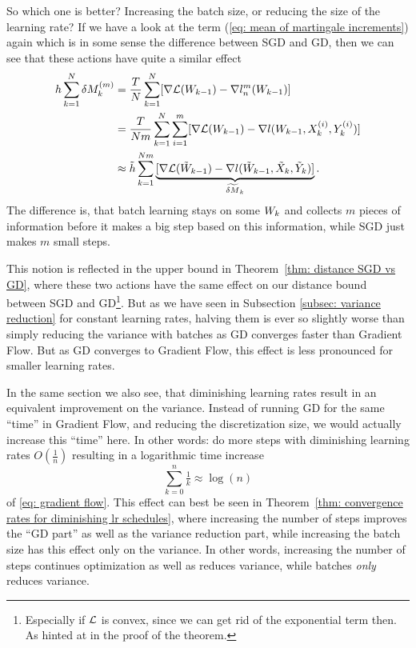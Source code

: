 So which one is better? Increasing the batch size, or reducing the size of the
learning rate? If we have a look at the term (\ref{eq: mean of
martingale increments}) again which is in some sense the difference between SGD
and GD, then we can see that these actions have quite a similar effect
\begin{align*}
	h\sum_{k=1}^N\delta M_k^{(m)}
	&=\frac{T}{N}\sum_{k=1}^N
	[\nabla\mathcal{L}(W_{k-1})- \nabla l_n^m(W_{k-1})]\\
	&=\frac{T}{Nm}\sum_{k=1}^N\sum_{i=1}^m
	[\nabla\mathcal{L}(W_{k-1})-\nabla l(W_{k-1},X^{(i)}_k, Y^{(i)}_k)]\\
	&\approx \tilde{h} \sum_{k=1}^{Nm}
	\underbrace{
		[\nabla\mathcal{L}(\tilde{W}_{k-1})
		-\nabla l(\tilde{W}_{k-1}, \tilde{X}_k, \tilde{Y}_k)]
	}_{\widetilde{\delta M}_k}.
\end{align*}
The difference is, that batch learning stays on some \(W_k\) and collects
\(m\) pieces of information before it makes a big step based on this information,
while SGD just makes \(m\) small steps.

This notion is reflected in the upper bound in Theorem~\ref{thm: distance SGD vs
GD}, where these two actions have the same effect on our distance bound between SGD and
GD\footnote{
	Especially if \(\mathcal{L}\) is convex, since we can get rid of the exponential
	term then. As hinted at in the proof of the theorem.
}. But as we have seen in
Subsection \ref{subsec: variance reduction} for constant learning rates, halving
them is ever so slightly worse than simply reducing the variance
with batches as GD converges faster than Gradient Flow. But as GD converges
to Gradient Flow, this effect is less pronounced for smaller learning rates.

In the same section we also see, that diminishing learning rates result in an
equivalent improvement on the variance. Instead of running GD for the same
``time'' in Gradient Flow, and reducing the discretization size, we would
actually increase this ``time'' here. In other words: do more steps with
diminishing learning rates \(O(\tfrac1n)\) resulting in a logarithmic time
increase 
 \[
	\sum_{k=0}^n\tfrac{1}{k}\approx\log(n)
\]
of \ref{eq: gradient flow}.
This effect can best be seen in Theorem~\ref{thm: convergence rates for
diminishing lr schedules}, where increasing the number of steps improves the ``GD
part'' as well as the variance reduction part, while increasing the batch size
has this effect only on the variance. In other words, increasing the number of
steps continues optimization as well as reduces variance, while batches
\emph{only} reduces variance.

